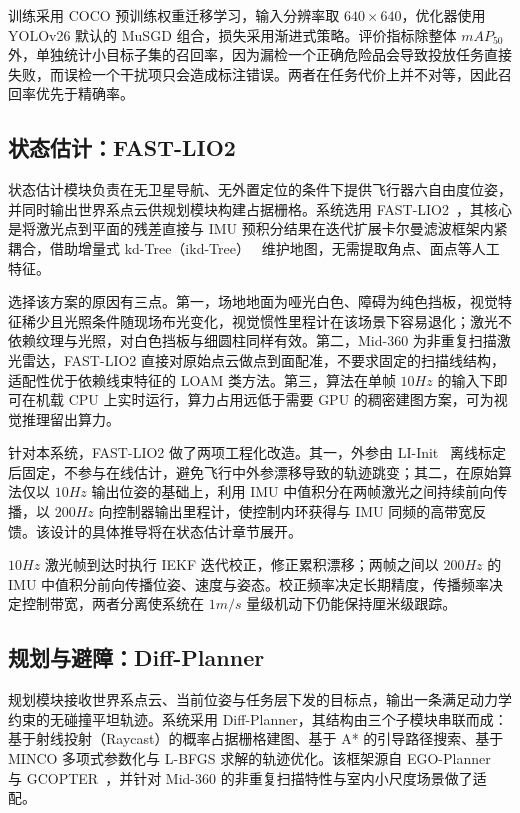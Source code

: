 训练采用 COCO 预训练权重迁移学习，输入分辨率取 $640\times640$，优化器使用 YOLOv26 默认的 MuSGD 组合，损失采用渐进式策略。评价指标除整体 $\unit{mAP}_{50}$ 外，单独统计小目标子集的召回率，因为漏检一个正确危险品会导致投放任务直接失败，而误检一个干扰项只会造成标注错误。两者在任务代价上并不对等，因此召回率优先于精确率。

\subsection{状态估计：FAST-LIO2}

状态估计模块负责在无卫星导航、无外置定位的条件下提供飞行器六自由度位姿，并同时输出世界系点云供规划模块构建占据栅格。系统选用 FAST-LIO2~\cite{xu2022fastlio2}，其核心是将激光点到平面的残差直接与 IMU 预积分结果在迭代扩展卡尔曼滤波框架内紧耦合，借助增量式 kd-Tree（ikd-Tree）~\cite{cai2021ikdtree} 维护地图，无需提取角点、面点等人工特征。

选择该方案的原因有三点。第一，场地地面为哑光白色、障碍为纯色挡板，视觉特征稀少且光照条件随现场布光变化，视觉惯性里程计在该场景下容易退化；激光不依赖纹理与光照，对白色挡板与细圆柱同样有效。第二，Mid-360 为非重复扫描激光雷达，FAST-LIO2 直接对原始点云做点到面配准，不要求固定的扫描线结构，适配性优于依赖线束特征的 LOAM 类方法。第三，算法在单帧 $10\unit{Hz}$ 的输入下即可在机载 CPU 上实时运行，算力占用远低于需要 GPU 的稠密建图方案，可为视觉推理留出算力。

针对本系统，FAST-LIO2 做了两项工程化改造。其一，外参由 LI-Init~\cite{zhu2022liinit} 离线标定后固定，不参与在线估计，避免飞行中外参漂移导致的轨迹跳变；其二，在原始算法仅以 $10\unit{Hz}$ 输出位姿的基础上，利用 IMU 中值积分在两帧激光之间持续前向传播，以 $200\unit{Hz}$ 向控制器输出里程计，使控制内环获得与 IMU 同频的高带宽反馈。该设计的具体推导将在状态估计章节展开。

\begin{techbox}[双频状态估计]
$10\unit{Hz}$ 激光帧到达时执行 IEKF 迭代校正，修正累积漂移；两帧之间以 $200\unit{Hz}$ 的 IMU 中值积分前向传播位姿、速度与姿态。校正频率决定长期精度，传播频率决定控制带宽，两者分离使系统在 $1\unit{m/s}$ 量级机动下仍能保持厘米级跟踪。
\end{techbox}

\subsection{规划与避障：Diff-Planner}

规划模块接收世界系点云、当前位姿与任务层下发的目标点，输出一条满足动力学约束的无碰撞平坦轨迹。系统采用 Diff-Planner，其结构由三个子模块串联而成：基于射线投射（Raycast）的概率占据栅格建图、基于 A* 的引导路径搜索、基于 MINCO 多项式参数化与 L-BFGS 求解的轨迹优化。该框架源自 EGO-Planner~\cite{zhou2021egoplanner} 与 GCOPTER~\cite{wang2022gcopter}，并针对 Mid-360 的非重复扫描特性与室内小尺度场景做了适配。

